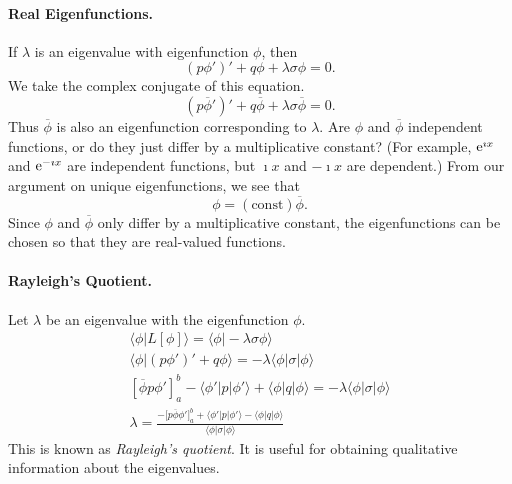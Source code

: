 \paragraph{Real Eigenfunctions.}
If $\lambda$ is an eigenvalue with eigenfunction $\phi$, then
\[ 
(p \phi')' + q \phi + \lambda \sigma \phi = 0.
\]
We take the complex conjugate of this equation.
\[ 
\left(p \overline{\phi}' \right)' + q \overline{\phi} + \lambda \sigma \overline{\phi} = 0.
\]
Thus $\overline{\phi}$ is also an eigenfunction corresponding to $\lambda$.  Are 
$\phi$ and $\overline{\phi}$ independent functions, or do they just differ
by a multiplicative constant?  (For example, $\mathop{\mathrm{e}}\nolimits^{\imath x}$ and $\mathop{\mathrm{e}}\nolimits^{-\imath x}$ are
independent functions, but $\imath x$ and $- \imath x$ are dependent.)
From our argument on unique eigenfunctions, we see that
\[ 
\phi = (\mathrm{const}) \overline{\phi}. 
\]
Since $\phi$ and $\overline{\phi}$ only differ by a multiplicative constant, 
the eigenfunctions can be chosen so that they are real-valued functions.







\paragraph{Rayleigh's Quotient.}
Let $\lambda$ be an eigenvalue with the eigenfunction $\phi$.
\begin{gather*}
  \langle \phi | L[\phi] \rangle = \langle \phi | - \lambda \sigma \phi \rangle 
  \\
  \langle \phi | (p \phi')' + q \phi \rangle = - \lambda \langle \phi | \sigma | \phi \rangle 
  \\
  \left[\overline{\phi} p \phi' \right]_a^b - \langle \phi' | p | \phi' \rangle + \langle \phi | q | \phi \rangle
  = - \lambda \langle \phi | \sigma | \phi \rangle 
  \\
  \boxed{ 
    \lambda = \frac{ -\big[p \overline{\phi} \phi' \big]_a^b + \langle \phi' | p | \phi' \rangle 
      - \langle \phi | q | \phi \rangle}
    { \langle \phi | \sigma | \phi \rangle }
    }
\end{gather*}
This is known as \textit{Rayleigh's quotient}.  It is useful for obtaining
qualitative information about the eigenvalues.











